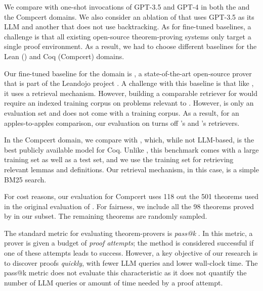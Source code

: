 We compare with one-shot invocations of GPT-3.5 and GPT-4 in both the  and the Compcert domains. We also consider an ablation of \copra that uses GPT-3.5 as its LLM and another that does not use backtracking. 
As for fine-tuned baselines, a challenge is that all existing open-source theorem-proving systems only target a single proof environment. As a result, we had to choose different baselines for the Lean () and Coq (Compcert) domains.



Our fine-tuned baseline for the  domain is \reprover, a state-of-the-art open-source prover that is part of the Leandojo project \citep{yang2023leandojo}. A challenge with this baseline is that like \copra, it uses a retrieval mechanism. However, building a comparable retriever for \copra would require an indexed training corpus on problems relevant to . However,  is only an evaluation set and does not come with a training corpus.
As a result, for an apples-to-apples comparison, our evaluation on  turns off \copra's and \reprover's retrievers.  

In the Compcert domain, we compare with \proverbot \citep{sanchez2020generating}, which, while not LLM-based, is the best publicly available model for Coq. Unlike , this benchmark comes with a large training set as well as a test set, and we use the training set for retrieving relevant lemmas and definitions. Our retrieval mechanism, in this case, is a simple BM25 search. 



For cost reasons, our evaluation for Compcert uses 118 out the 501 theorems used in the original evaluation of \proverbot \cite{sanchez2020generating}. For fairness, we include all the 98 theorems proved by \proverbot in our subset. The remaining theorems are randomly sampled. 

The standard metric for evaluating theorem-provers is \emph{pass@k} \citep{lample2022hypertree,yang2023leandojo}. In this metric, a prover is given a budget of  
\emph{proof attempts}; the method is considered successful if one of these attempts leads to success.
However, a key objective of our research is to discover proofs \emph{quickly}, with fewer LLM queries and lower wall-clock time. The pass@k metric does not evaluate this characteristic as it does not quantify the number of LLM queries or amount of time needed by a proof attempt.   


